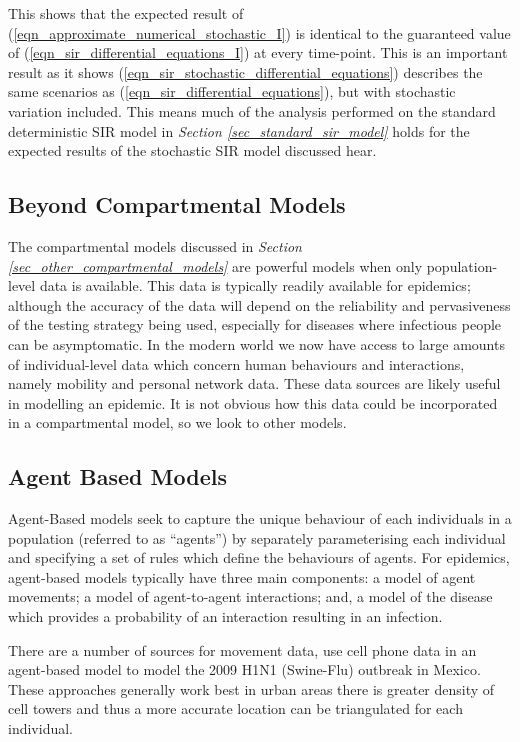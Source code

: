 \documentclass[11pt,a4paper]{article}
\theoremstyle{break}
\begin{document}
  \par This shows that the expected result of (\ref{eqn_approximate_numerical_stochastic_I}) is identical to the guaranteed value of (\ref{eqn_sir_differential_equations_I}) at every time-point. This is an important result as it shows (\ref{eqn_sir_stochastic_differential_equations}) describes the same scenarios as (\ref{eqn_sir_differential_equations}), but with stochastic variation included. This means much of the analysis performed on the standard deterministic SIR model in \textit{Section \ref{sec_standard_sir_model}} holds for the expected results of the stochastic SIR model discussed hear.

\subsection{Beyond Compartmental Models}\label{sec_beyond_compartmental_models}

  \par The compartmental models discussed in \textit{Section \ref{sec_other_compartmental_models}} are powerful models when only population-level data is available. This data is typically readily available for epidemics; although the accuracy of the data will depend on the reliability and pervasiveness of the testing strategy being used, especially for diseases where infectious people can be asymptomatic. In the modern world we now have access to large amounts of individual-level data which concern human behaviours and interactions, namely mobility and personal network data. These data sources are likely useful in modelling an epidemic. It is not obvious how this data could be incorporated in a compartmental model, so we look to other models.

\subsection*{Agent Based Models}

  \par Agent-Based models seek to capture the unique behaviour of each individuals in a population (referred to as ``agents'') by separately parameterising each individual and specifying a set of rules which define the behaviours of agents. For epidemics, agent-based models  typically have three main components: a model of agent movements; a model of agent-to-agent interactions; and, a model of the disease which provides a probability of an interaction resulting in an infection.

  \par There are a number of sources for movement data, \cite[]{agent_based_model_of_epidemic_spread} use cell phone data in an agent-based model to model the 2009 H1N1 (Swine-Flu) outbreak in Mexico. These approaches generally work best in urban areas there is greater density of cell towers and thus a more accurate location can be triangulated for each individual.
\end{document}
